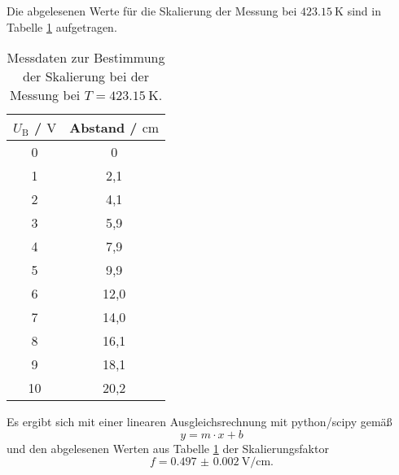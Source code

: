 Die abgelesenen Werte für die Skalierung der Messung bei $\SI{423.15}{\kelvin}$ sind in
Tabelle \ref{tab:skalierung_a_2} aufgetragen.
\begin{table}
	\centering
	\caption{Messdaten zur Bestimmung der Skalierung bei der Messung bei $T=\SI{423.15}{\kelvin}$.}
	\label{tab:skalierung_a_2}
	\begin{tabular}{cc}
		\toprule
		$U_{\mathrm{B}}$ / $\si{\volt}$ & Abstand / $\si{\centi\meter}$ \\
		\midrule
		0 & 0 \\
		1 & 2,1 \\
		2 & 4,1 \\
		3 & 5,9 \\
		4 & 7,9 \\
		5 & 9,9 \\
		6 & 12,0 \\
		7 & 14,0 \\
		8 & 16,1 \\
		9 & 18,1 \\
		10 & 20,2 \\
		\bottomrule
	\end{tabular}
\end{table}
Es ergibt sich mit einer linearen Ausgleichsrechnung mit python/scipy \cite{scipy} gemäß
\begin{equation*}
	y = m \cdot x + b
\end{equation*}
 und den abgelesenen Werten aus Tabelle \ref{tab:skalierung_a_2} der Skalierungsfaktor
\begin{equation*}
	f = \SI{0.497(2)}{\volt\per\centi\meter} \mathrm{.}
\end{equation*}

